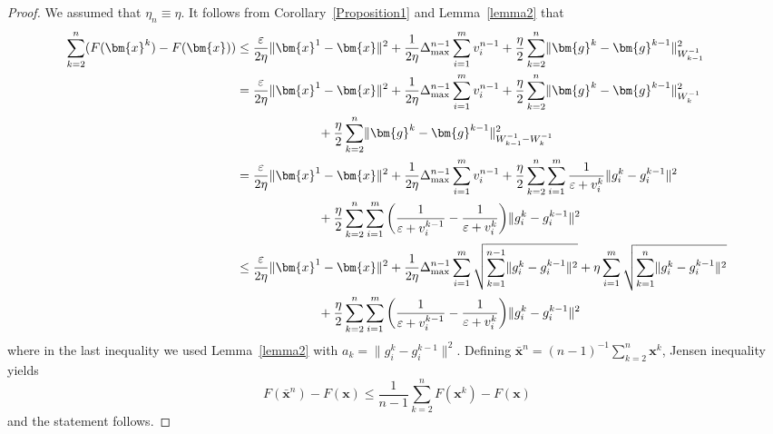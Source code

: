 \documentclass[11pt]{article}
\theoremstyle{plain}
\theoremstyle{definition}
\theoremstyle{remark}
\newcommand{\norm}[1]{\lVert{#1}\rVert}
\newcommand{\bx}{\bm{x}}
\newcommand{\buu}{\bm{g}}
\newcommand{\uu}{g}
\newcommand{\iter}{n}
\newcommand{\ite}{k}
\newcommand{\W}{W}
\begin{document}
\begin{proof}
We assumed that $\eta_\iter\equiv \eta$.
It follows from Corollary~\ref{Proposition1} and Lemma~\ref{lemma2} that
\begin{align*}
\sum_{\ite=2}^\iter(F(\bx^\ite) - F(\bx)) 
    &\leq \frac{\varepsilon}{2\eta}\lVert \bx^1 - \bx\rVert^2 + \frac{1}{2\eta}\Delta_{\max}^{\iter-1} \sum_{i=1}^m v_i^{\iter-1} + \frac{\eta}{2}\sum_{\ite=2}^\iter \lVert \buu^{\ite} - \buu^{\ite-1} \rVert_{\W_{\ite-1}^{-1}}^2 \\
    &= \frac{\varepsilon}{2\eta}\lVert \bx^1 - \bx\rVert^2 + \frac{1}{2\eta}\Delta_{\max}^{\iter-1} \sum_{i=1}^m v_i^{\iter-1} + \frac{\eta}{2}\sum_{\ite=2}^\iter \lVert \buu^{\ite} - \buu^{\ite-1} \rVert_{\W_{\ite}^{-1}}^2\\
    &\hspace{15ex}+ \frac{\eta}{2}\sum_{\ite=2}^\iter \lVert \buu^{\ite} - \buu^{\ite-1} \rVert_{\W_{\ite-1}^{-1}- \W_{\ite}^{-1}}^2\\
    &= \frac{\varepsilon}{2\eta}\lVert \bx^1 - \bx\rVert^2 + \frac{1}{2\eta}\Delta_{\max}^{\iter-1} \sum_{i=1}^m v_i^{\iter-1} + \frac{\eta}{2}\sum_{\ite=2}^\iter \sum_{i=1}^m \frac{1}{\varepsilon+ v_i^\ite}\lVert \uu_i^{\ite} - \uu_i^{\ite-1} \rVert^2\\
    &\hspace{15ex}+ \frac{\eta}{2}\sum_{\ite=2}^\iter \sum_{i=1}^m \bigg(\frac{1}{\varepsilon+ v_i^{\ite-1}}-\frac{1}{\varepsilon + v_i^\ite}\bigg)\norm{\uu_i^{\ite} - \uu_i^{\ite-1}}^2\\
    &\leq \frac{\varepsilon}{2\eta}\lVert \bx^1 - \bx\rVert^2 + \frac{1}{2\eta}\Delta_{\max}^{\iter-1} \sum_{i=1}^m \sqrt{\sum_{k=1}^{\iter-1}\norm{\uu_i^\ite-\uu_i^{\ite-1}}^2} + \eta \sum_{i=1}^m \sqrt{\sum_{\ite=1}^\iter \lVert \uu_i^{\ite} - \uu_i^{\ite-1}\rVert^2}\\
    &\hspace{15ex}+ \frac{\eta}{2}\sum_{\ite=2}^\iter \sum_{i=1}^m \bigg(\frac{1}{\varepsilon+ v_i^{\ite-1}}-\frac{1}{\varepsilon + v_i^\ite}\bigg)\norm{\uu_i^{\ite} - \uu_i^{\ite-1}}^2
    \end{align*}
    where in the last inequality we used Lemma~\ref{lemma2} with $a_k = \norm{\uu_i^\ite- \uu_i^{\ite-1}}^2$. Defining $\bar{\bx}^\iter = (\iter-1)^{-1}\sum_{\ite=2}^\iter \bx^\ite$, Jensen inequality yields
    \begin{equation*}
    F(\bar{\bx}^\iter)- F(\bx) \leq \frac{1}{\iter-1} \sum_{\ite=2}^\iter F(\bx^\ite)-F(\bx)
    \end{equation*}
    and the statement follows.
\end{proof}
\end{document}
